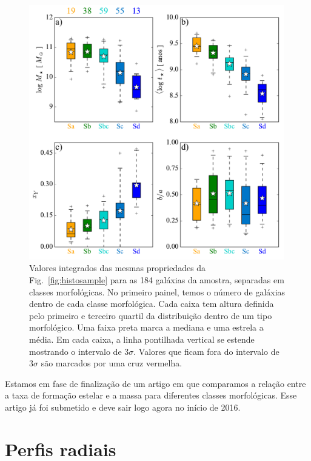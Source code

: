 \begin{figure}
	\centering
	\includegraphics[width=0.99\textwidth]{figuras/sample_realsample_maskradius_integrated.pdf}
	\caption[Classificação por morfologia]
	{Valores integrados das mesmas propriedades da Fig.\ \ref{fig:histosample} para as 184
galáxias da amostra, separadas em classes morfológicas. No primeiro painel, temos o número de
galáxias dentro de cada classe morfológica. Cada caixa tem altura definida pelo primeiro e terceiro
quartil da distribuição dentro de um tipo morfológico. Uma faixa preta marca a mediana e uma
estrela a média. Em cada caixa, a linha pontilhada vertical se estende mostrando o intervalo de
$3\sigma$. Valores que ficam fora do intervalo de $3\sigma$ são marcados por uma cruz vermelha.}
	\label{fig:amostraMorf}
\end{figure}

Estamos em fase de finalização de um artigo em que comparamos a relação entre a taxa de formação
estelar e a massa para diferentes classes morfológicas. Esse artigo já foi submetido e deve sair
logo agora no início de 2016.

\section{Perfis radiais}
\label{sec:amostra:rad}

